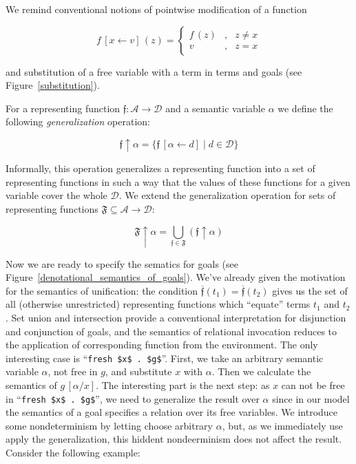 We remind conventional notions of pointwise modification of a function

\[
f\,[x\gets v]\,(z)=\left\{
\begin{array}{rcl}
  f\,(z) &,& z \ne x \\
  v      &,& z = x
\end{array}
\right.
\]

and substitution of a free variable with a term in terms and goals (see Figure~\ref{substitution}).

For a representing function $\mathfrak{f}:\mathcal{A}\to\mathcal{D}$ and a semantic variable $\alpha$ we define
the following \emph{generalization} operation:

\[
\mathfrak{f}\uparrow\alpha = \{ \mathfrak{f}\,[\alpha\gets d] \mid d\in\mathcal D\}
\]

Informally, this operation generalizes a representing function into a set of representing functions in such a way that the
values of these functions for a given variable cover the whole $\mathcal{D}$. We extend the generalization operation for sets of
representing functions $\mathfrak{F}\subseteq\mathcal{A}\to\mathcal{D}$:

\[
  \mathfrak{F}\uparrow\alpha = \bigcup_{\mathfrak{f}\in\mathfrak{F}}(\mathfrak{f}\uparrow\alpha)
\]

Now we are ready to specify the sematics for goals (see Figure~\ref{denotational_semantics_of_goals}). We've already given the motivation for
the semantics of unification: the condition $\overline{\mathfrak{f}}(t_1)=\overline{\mathfrak{f}}(t_2)$ gives us the set of all (otherwise
unrestricted) representing functions which ``equate'' terms $t_1$ and $t_2$. Set union and intersection provide a conventional interpretation
for disjunction and conjunction of goals, and the semantics of relational invocation reduces to the application of corresponding
function from the environment. The only interesting case is ``\lstinline|fresh $x$ . $g$|''. First, we take an arbitrary semantic variable $\alpha$,
not free in $g$, and substitute $x$ with $\alpha$. Then we calculate the semantics of $g\,[\alpha/x]$. The interesting part is the next step:
as $x$ can not be free in ``\lstinline|fresh $x$ . $g$|'', we need to generalize the result over $\alpha$ since in our model the semantics of a
goal specifies a relation over its free variables. We introduce some nondeterminism by letting choose arbitrary $\alpha$, but, as we immediately
use apply the generalization, this hiddent nondeerminism does not affect the result. Consider the following example:

